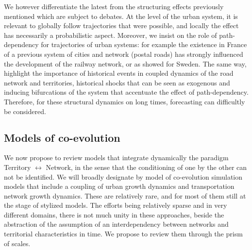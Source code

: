 We however differentiate the latest from the structuring effects previously mentioned which are subject to debates. At the level of the urban system, it is relevant to globally follow trajectories that were possible, and locally the effect has necessarily a probabilistic aspect. Moreover, we insist on the role of path-dependency for trajectories of urban systems: for example the existence in France of a previous system of cities and network (postal roads) has strongly influenced the development of the railway network, or as \cite{berger2017locomotives} showed for Sweden. The same way, \cite{doi:10.1068/b39089} highlight the importance of historical events in coupled dynamics of the road network and territories, historical shocks that can be seen as exogenous and inducing bifurcations of the system that accentuate the effect of path-dependency. Therefore, for these structural dynamics on long times, forecasting can difficultly be considered.


\subsection{Models of co-evolution}

 We now propose to review models that integrate dynamically the paradigm Territory $\leftrightarrow$ Network, in the sense that the conditioning of one by the other can not be identified. We will broadly designate by model of co-evolution simulation models that include a coupling of urban growth dynamics and transportation network growth dynamics. These are relatively rare, and for most of them still at the stage of stylized models. The efforts being relatively sparse and in very different domains, there is not much unity in these approaches, beside the abstraction of the assumption of an interdependency between networks and territorial characteristics in time. We propose to review them through the prism of scales.



